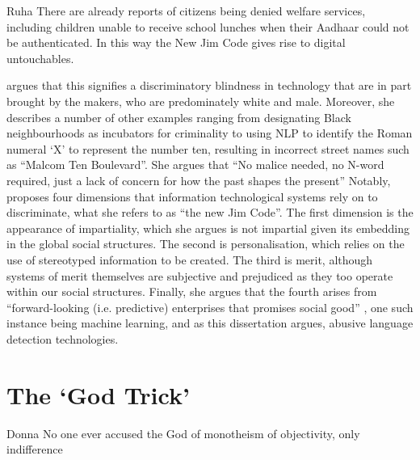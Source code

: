\begin{citequote}{Ruha \citet[p. 133]{Benjamin:2019}}
  There are already reports of citizens being denied welfare services, including children unable to receive school lunches when their Aadhaar could not be authenticated. In this way the New Jim Code gives rise to digital untouchables.
\end{citequote}

\citet{Benjamin:2019} argues that this signifies a discriminatory blindness in technology that are in part brought by the makers, who are predominately white and male.
Moreover, she describes a number of other examples ranging from designating Black neighbourhoods as incubators for criminality to using NLP to identify the Roman numeral `X' to represent the number ten, resulting in incorrect street names such as ``Malcom Ten Boulevard''.
She argues that ``No malice needed, no N-word required, just a lack of concern for how the past shapes the present'' \citep[p. 48]{Benjamin:2019}
Notably, \citet{Benjamin:2019} proposes four dimensions that information technological systems rely on to discriminate, what she refers to as ``the new Jim Code''.
The first dimension is the appearance of impartiality, which she argues is not impartial given its embedding in the global social structures.
The second is personalisation, which relies on the use of stereotyped information to be created.
The third is merit, although systems of merit themselves are subjective and prejudiced as they too operate within our social structures.
Finally, she argues that the fourth arises from ``forward-looking (i.e. predictive) enterprises that promises social good'' \citep[p. 85]{Benjamin:2019}, one such instance being machine learning, and as this dissertation argues, abusive language detection technologies.

\section{The `God Trick'}

\begin{citequote}{Donna \citet{Haraway:1988}}
  No one ever accused the God of monotheism of objectivity, only indifference
\end{citequote}

